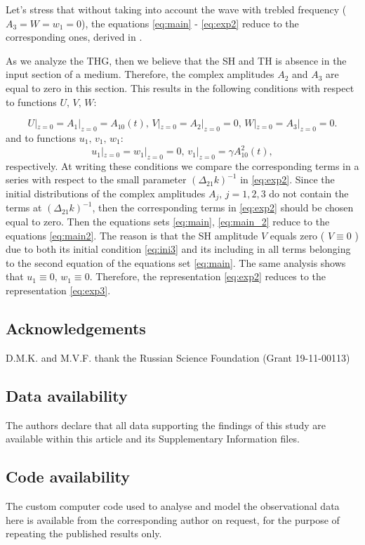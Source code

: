 \documentclass[a4paper, 12pt, onecolumn]{extarticle}
\begin{document}
Let's stress that without taking into account the wave with trebled frequency (\(A_3=W=w_1=0\)),  the equations \eqref{eq:main} -  \eqref{eq:exp2} reduce to the corresponding ones, derived in \cite{bib:n19}.

As we analyze the THG, then we believe that  the  SH and TH is absence in the input section of a medium. Therefore, the complex amplitudes \(A_2\) and \(A_3\) are equal to zero in this section. This results in the following conditions with respect to functions  \(U,\,V,\,W\):

\begin{equation}
\label{eq:ini3}
U|_{z=0}=A_1|_{z=0}=A_{10}(t),\,
V|_{z=0}=A_2|_{z=0}=0,\,
W|_{z=0}=A_3|_{z=0}=0.
\end{equation}
and to functions \(u_1,\,v_1,\,w_1\):
\begin{equation}
\label{eq:ini4}
 u_1|_{z=0}=w_1|_{z=0}=0,\, v_1|_{z=0}=\gamma A_{10}^2(t),
\end{equation}
respectively. At writing these conditions we  compare the corresponding terms in a series with respect to the small parameter \((\Delta_{21}k)^{-1}\) in \eqref{eq:exp2}. Since the initial distributions of the complex amplitudes \(A_j,\,j=1,2,3\) do not contain the terms at \((\Delta_{21}k)^{-1}\), then the corresponding terms in \eqref{eq:exp2} should be chosen equal to zero. Then the equations sets \eqref{eq:main}, \eqref{eq:main_2} reduce to the equations \eqref{eq:main2}. The reason is that the SH amplitude \(V\) equals zero ( \(V\equiv0\) ) due to both its initial condition \eqref{eq:ini3} and its including in all terms belonging to the second equation of the equations set \eqref{eq:main}. The same analysis shows that \(u_1\equiv0,\,w_1\equiv0\). Therefore, the representation \eqref{eq:exp2} reduces to the representation \eqref{eq:exp3}.
\subsection*{Acknowledgements}
D.M.K. and M.V.F. thank the Russian Science Foundation (Grant 19-11-00113)

\subsection*{Data availability}
The authors declare that all data supporting the findings of this study are available
within this article and its Supplementary Information files.

\subsection*{Code availability}
The custom computer code used to analyse and model the observational data here is available from the corresponding author on request, for the purpose of repeating 
the published results only.
\end{document}
